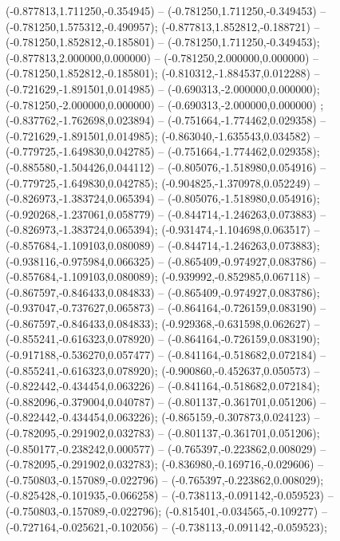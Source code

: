  (-0.877813,1.711250,-0.354945) -- (-0.781250,1.711250,-0.349453) -- (-0.781250,1.575312,-0.490957);
 (-0.877813,1.852812,-0.188721) -- (-0.781250,1.852812,-0.185801) -- (-0.781250,1.711250,-0.349453);
 (-0.877813,2.000000,0.000000) -- (-0.781250,2.000000,0.000000) -- (-0.781250,1.852812,-0.185801);
 (-0.810312,-1.884537,0.012288) -- (-0.721629,-1.891501,0.014985) -- (-0.690313,-2.000000,0.000000);
 (-0.781250,-2.000000,0.000000) -- (-0.690313,-2.000000,0.000000) ;
 (-0.837762,-1.762698,0.023894) -- (-0.751664,-1.774462,0.029358) -- (-0.721629,-1.891501,0.014985);
 (-0.863040,-1.635543,0.034582) -- (-0.779725,-1.649830,0.042785) -- (-0.751664,-1.774462,0.029358);
 (-0.885580,-1.504426,0.044112) -- (-0.805076,-1.518980,0.054916) -- (-0.779725,-1.649830,0.042785);
 (-0.904825,-1.370978,0.052249) -- (-0.826973,-1.383724,0.065394) -- (-0.805076,-1.518980,0.054916);
 (-0.920268,-1.237061,0.058779) -- (-0.844714,-1.246263,0.073883) -- (-0.826973,-1.383724,0.065394);
 (-0.931474,-1.104698,0.063517) -- (-0.857684,-1.109103,0.080089) -- (-0.844714,-1.246263,0.073883);
 (-0.938116,-0.975984,0.066325) -- (-0.865409,-0.974927,0.083786) -- (-0.857684,-1.109103,0.080089);
 (-0.939992,-0.852985,0.067118) -- (-0.867597,-0.846433,0.084833) -- (-0.865409,-0.974927,0.083786);
 (-0.937047,-0.737627,0.065873) -- (-0.864164,-0.726159,0.083190) -- (-0.867597,-0.846433,0.084833);
 (-0.929368,-0.631598,0.062627) -- (-0.855241,-0.616323,0.078920) -- (-0.864164,-0.726159,0.083190);
 (-0.917188,-0.536270,0.057477) -- (-0.841164,-0.518682,0.072184) -- (-0.855241,-0.616323,0.078920);
 (-0.900860,-0.452637,0.050573) -- (-0.822442,-0.434454,0.063226) -- (-0.841164,-0.518682,0.072184);
 (-0.882096,-0.379004,0.040787) -- (-0.801137,-0.361701,0.051206) -- (-0.822442,-0.434454,0.063226);
 (-0.865159,-0.307873,0.024123) -- (-0.782095,-0.291902,0.032783) -- (-0.801137,-0.361701,0.051206);
 (-0.850177,-0.238242,0.000577) -- (-0.765397,-0.223862,0.008029) -- (-0.782095,-0.291902,0.032783);
 (-0.836980,-0.169716,-0.029606) -- (-0.750803,-0.157089,-0.022796) -- (-0.765397,-0.223862,0.008029);
 (-0.825428,-0.101935,-0.066258) -- (-0.738113,-0.091142,-0.059523) -- (-0.750803,-0.157089,-0.022796);
 (-0.815401,-0.034565,-0.109277) -- (-0.727164,-0.025621,-0.102056) -- (-0.738113,-0.091142,-0.059523);
